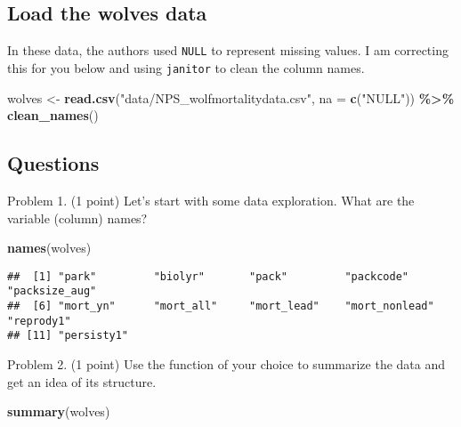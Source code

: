 \documentclass[
]{article}
\newenvironment{Shaded}{\begin{snugshade}}{\end{snugshade}}
\newcommand{\AttributeTok}[1]{\textcolor[rgb]{0.13,0.29,0.53}{#1}}
\newcommand{\FunctionTok}[1]{\textcolor[rgb]{0.13,0.29,0.53}{\textbf{#1}}}
\newcommand{\NormalTok}[1]{#1}
\newcommand{\OtherTok}[1]{\textcolor[rgb]{0.56,0.35,0.01}{#1}}
\newcommand{\SpecialCharTok}[1]{\textcolor[rgb]{0.81,0.36,0.00}{\textbf{#1}}}
\newcommand{\StringTok}[1]{\textcolor[rgb]{0.31,0.60,0.02}{#1}}
\begin{document}
\hypertarget{load-the-wolves-data}{%
\subsection{Load the wolves data}\label{load-the-wolves-data}}

In these data, the authors used \texttt{NULL} to represent missing
values. I am correcting this for you below and using \texttt{janitor} to
clean the column names.

\begin{Shaded}
\begin{Highlighting}[]
\NormalTok{wolves }\OtherTok{\textless{}{-}} \FunctionTok{read.csv}\NormalTok{(}\StringTok{"data/NPS\_wolfmortalitydata.csv"}\NormalTok{, }\AttributeTok{na =} \FunctionTok{c}\NormalTok{(}\StringTok{"NULL"}\NormalTok{)) }\SpecialCharTok{\%\textgreater{}\%} \FunctionTok{clean\_names}\NormalTok{()}
\end{Highlighting}
\end{Shaded}

\hypertarget{questions}{%
\subsection{Questions}\label{questions}}

Problem 1. (1 point) Let's start with some data exploration. What are
the variable (column) names?

\begin{Shaded}
\begin{Highlighting}[]
\FunctionTok{names}\NormalTok{(wolves)}
\end{Highlighting}
\end{Shaded}

\begin{verbatim}
##  [1] "park"         "biolyr"       "pack"         "packcode"     "packsize_aug"
##  [6] "mort_yn"      "mort_all"     "mort_lead"    "mort_nonlead" "reprody1"    
## [11] "persisty1"
\end{verbatim}

Problem 2. (1 point) Use the function of your choice to summarize the
data and get an idea of its structure.

\begin{Shaded}
\begin{Highlighting}[]
\FunctionTok{summary}\NormalTok{(wolves)}
\end{Highlighting}
\end{Shaded}
\end{document}
